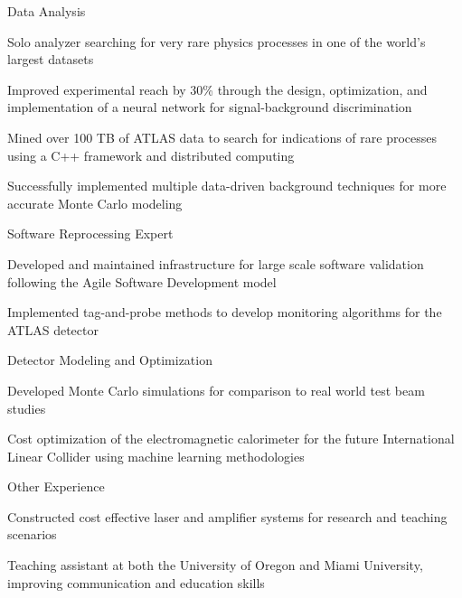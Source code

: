 
\begin{cventries}
  \cventry
    {Data Analysis} %
    {} %
    {} %
    {} %
    {
      \begin{cvitems} %
        \item {Solo analyzer searching for very rare physics processes in one of the world's largest datasets}
        \item {Improved experimental reach by 30\% through the design, optimization, and implementation of a neural network for signal-background discrimination}
        \item {Mined over 100 TB of ATLAS data to search for indications of rare processes using a C++ framework and distributed computing}
         \item{Successfully implemented multiple data-driven background techniques for more accurate Monte Carlo modeling}
      \end{cvitems}
    } 
    \cventry
    {Software Reprocessing Expert} %
    {} %
    {} %
    {} %
    {
      \begin{cvitems} %
        \item {Developed and maintained infrastructure for large scale software validation following the Agile Software Development model }
        \item {Implemented tag-and-probe methods to develop monitoring algorithms for the ATLAS detector}
      \end{cvitems}
    }     
    \cventry
    {Detector Modeling and Optimization}
    {}
    {}
    {}
    {
    \begin{cvitems}
    	\item Developed Monte Carlo simulations for comparison to real world test beam studies
    	\item Cost optimization of the electromagnetic calorimeter for the future International Linear Collider using machine learning methodologies
    \end{cvitems}
    }
    \cventry
    {Other Experience} %
    {} %
    {} %
    {} %
    {
      \begin{cvitems} %
        \item {Constructed cost effective laser and amplifier systems for research and teaching scenarios}
        \item {Teaching assistant at both the University of Oregon and Miami University, improving communication and education skills}
      \end{cvitems}
    }    


\end{cventries}

